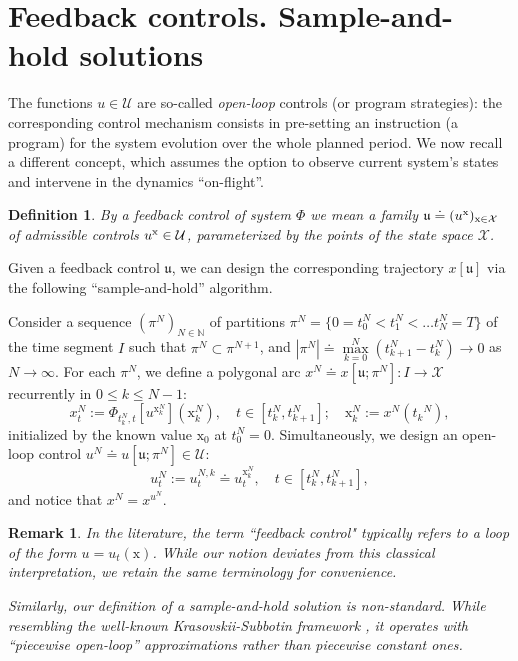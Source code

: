 \documentclass[sn-mathphys-num]{sn-jnl}
\numberwithin{equation}{section}
\theoremstyle{mythm}
\theoremstyle{mydef}
\newtheorem{remark}[proposition]{Remark}
\newtheorem{definition}[proposition]{Definition}
\begin{document}
\section{Feedback controls. Sample-and-hold solutions}\label{ssec:fbm}

The functions $u\in \mathcal U$ are so-called \emph{open-loop} controls (or program strategies): the corresponding control mechanism consists in pre-setting an instruction (a program) for the system evolution over the whole planned period. We now recall a different concept, which assumes the option to observe current system's states and intervene in the dynamics ``on-flight''. 
\begin{definition}
By a \emph{feedback control} of system $\Phi$ we mean a family $\mathfrak{u} \doteq (u^{\rm x})_{\mathrm x \in \mathcal X}$ of admissible controls $u^{\rm x} \in \mathcal U$, parameterized by the points of the state space $\mathcal X$.
\end{definition}
Given a feedback control $\mathfrak u$, we can design the corresponding trajectory $x[\mathfrak{u}]$ via the following ``sample-and-hold'' algorithm. 

Consider a sequence $(\pi^N)_{N \in \mathbb N}$ of partitions $\pi^N=\{0=t_0^N < t_1^N<\ldots t_N^N =T\}$ of the time segment $I$ such that $\pi^{N} \subset \pi^{N+1}$, and $|\pi^N| \doteq \max\limits_{k=0}^N\left(t_{k+1}^N-t_k^N\right) \to 0$ as $N \to \infty$. For each $\pi^N$, we define a polygonal arc $x^N\doteq x[\mathfrak{u}; \pi^N]\colon I \to {\mathcal X}$ recurrently in $0\leq k \leq N-1$:
\[
    x^N_t := \Phi_{t_k^N, t}\left[u^{\mathrm x^N_k}\right]({\mathrm x}^N_k), \quad  t \in [t_k^N, t_{k+1}^N]; \quad {\mathrm x}_k^N:= x^N({t_k}^N),
\]
initialized by the known value ${\mathrm x}_0$ at $t_0^N=0$. Simultaneously, we design an open-loop control $u^N \doteq u[\mathfrak u; \pi^N] \in \mathcal U$:
\[
    u^N_t := u^{N,k}_t \doteq u^{\mathrm x_k^N}_t, \quad  t \in [t_k^N, t_{k+1}^N],
\]
and notice that $x^N = x^{u^N}$.
\begin{remark}

In the literature, the term ``feedback control" typically refers to a loop of the form \( u = u_t(\mathrm{x}) \). While our notion deviates from this classical interpretation, we retain the same terminology for convenience.

Similarly, our definition of a sample-and-hold solution is non-standard. While resembling the well-known Krasovskii-Subbotin framework \cite{krasovskii2011game}, it operates with ``piecewise open-loop'' approximations rather than piecewise constant ones.

\end{remark}
\end{document}
